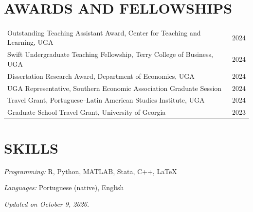 \documentclass[11pt,letterpaper]{article}
\begin{document}
\section*{AWARDS AND FELLOWSHIPS}
\begin{tabularx}{\textwidth}{Xr}
    Outstanding Teaching Assistant Award, Center for Teaching and Learning, UGA & 2024 \\
    Swift Undergraduate Teaching Fellowship, Terry College of Business, UGA & 2024 \\
    Dissertation Research Award, Department of Economics, UGA & 2024 \\
    UGA Representative, Southern Economic Association Graduate Session & 2024 \\
    Travel Grant, Portuguese--Latin American Studies Institute, UGA & 2024 \\
    Graduate School Travel Grant, University of Georgia & 2023 \\
\end{tabularx}

\section*{SKILLS}
\hspace*{2em} \textit{Programming:} R, Python, MATLAB, Stata, C++, \LaTeX\par
\hspace*{2em} \textit{Languages:} Portuguese (native), English

\vfill
\hfill \textit{Updated on October 9, 2026.}
\end{document}
